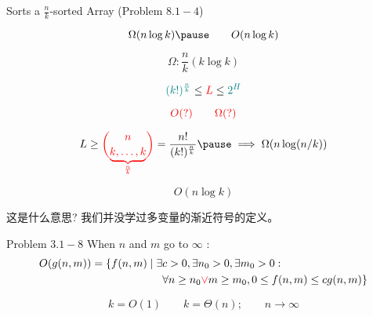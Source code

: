 
\begin{frame}{}
  \begin{exampleblock}{Sorts a $\frac{n}{k}$-sorted Array (Problem $8.1-4$)}

    \pause
    \vspace{-0.50cm}
    \[
      \Omega(n \log k) \pause \qquad O(n \log k)
    \]
  \end{exampleblock}

  \pause
  \vspace{-0.30cm}
  \[
    \Omega: \frac{n}{k} (k \log k)
  \]

  \pause
  \[
    \textcolor{teal}{(k!)^{\frac{n}{k}}} \le \textcolor{red}{L} \le \textcolor{teal}{2^{H}}
  \]
\end{frame}

\begin{frame}{}
  \centerline{}

  \pause
  \vspace{-0.30cm}
  \[
    \textcolor{red}{O(?)} \qquad \textcolor{red}{\Omega(?)}
  \]

  \pause
  \[
    L \ge \red{\binom{n}{\underbrace{k, \ldots, k}_{\frac{n}{k}}}} = \frac{n!}{(k!)^{\frac{n}{k}}} \pause \implies \Omega(n \log(n/k))
  \]
\end{frame}

\begin{frame}{}
  \[
    O(n \log k)
  \]

  \pause
  \begin{CJK*}{UTF8}{gbsn}
    \centerline{ 这是什么意思? 我们并没学过多变量的渐近符号的定义。} 
  \end{CJK*}

  \pause
  \vspace{0.30cm}
  \begin{exampleblock}{Problem $3.1-8$}
    When $n$ and $m$ go to $\infty$ :
    \begin{align*}
      O(g(n,m)) = \{f(n,m) \mid \exists & c > 0, \exists n_0 > 0, \exists m_0 > 0: \\
	& \forall n \ge n_0 \textcolor{red}{\lor} m \ge m_0, 0 \le f(n,m) \le cg(n,m)\}
    \end{align*}
  \end{exampleblock}

  \pause
  \vspace{0.30cm}
  \[
    k = O(1) \qquad k = \Theta(n); \qquad n \to \infty
  \]
\end{frame}

